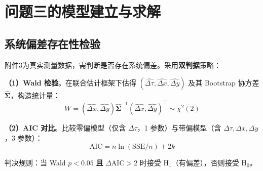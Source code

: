\section{问题三的模型建立与求解}\label{sec:model3}

\subsection{系统偏差存在性检验}

附件3为真实测量数据，需判断是否存在系统偏差。采用\textbf{双判据}策略：

\textbf{（1）Wald 检验}\cite{wald1943}。在联合估计框架下估得 $(\hat{\Delta\tau}, \hat{\Delta x}, \hat{\Delta y})$ 及其 Bootstrap\cite{efron1979} 协方差 $\hat{\boldsymbol{\Sigma}}$，构造统计量：
\begin{equation}
    W = (\hat{\Delta x}, \hat{\Delta y}) \hat{\boldsymbol{\Sigma}}^{-1} (\hat{\Delta x}, \hat{\Delta y})^\top \sim \chi^2(2)
\end{equation}

\textbf{（2）AIC 对比}\cite{akaike1974}。比较零偏模型（仅含 $\Delta\tau$，1 参数）与带偏模型（含 $\Delta\tau, \Delta x, \Delta y$，3 参数）：
\begin{equation}
    \text{AIC} = n \ln(\text{SSE}/n) + 2k
\end{equation}

判决规则：当 Wald $p < 0.05$ \textbf{且} $\Delta\text{AIC} > 2$ 时接受 H$_1$（有偏差），否则接受 H$_0$。

